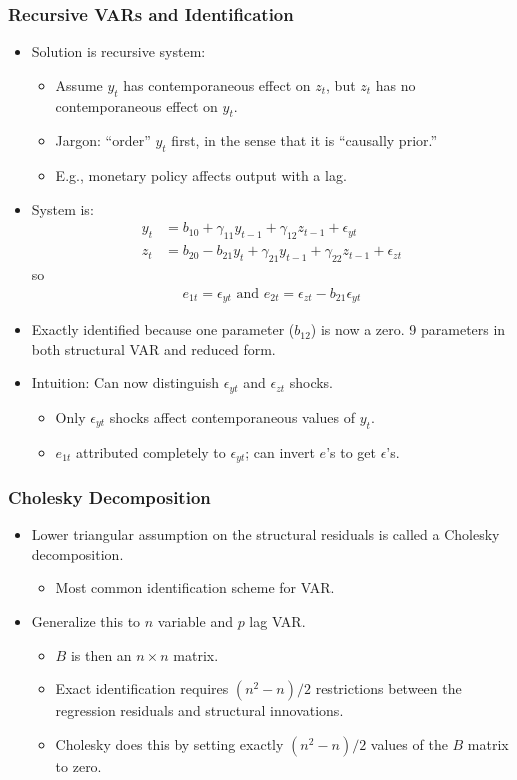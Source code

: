 \documentclass[english,xcolor=svgnames]{beamer}
\begin{document}
\begin{frame}
\frametitle{Recursive VARs and Identification
}
\begin{itemize}
	\item Solution is recursive system:
	\begin{itemize}
		\item Assume $y_t$ has contemporaneous effect on $z_t$, but $z_t$ has no
contemporaneous effect on $y_t$.
		\item Jargon: ``order'' $y_t$ first, in the sense that it is ``causally prior.''
		\item E.g., monetary policy affects output with a lag.
	\end{itemize}
	\item System is:
	\begin{align*}
		y_t &= b_{10} + \gamma_{11}y_{t-1}+\gamma_{12}z_{t-1}+\epsilon_{yt} \\
		z_t &= b_{20}-b_{21}y_t + \gamma_{21}y_{t-1}+\gamma_{22}z_{t-1}+\epsilon_{zt}
	\end{align*}
	so
	\begin{align*}
		e_{1t}=\epsilon_{yt}\text{ and }e_{2t}=\epsilon_{zt}-b_{21}\epsilon_{yt}
	\end{align*}
	\item Exactly identified because one parameter ($b_{12}$) is now a zero. 9 parameters in both structural VAR and reduced form.
	\item Intuition: Can now distinguish $\epsilon_{yt}$ and $\epsilon_{zt}$ shocks.
	\begin{itemize}
		\item Only $\epsilon_{yt}$ shocks affect contemporaneous values of $y_t$.
		\item $e_{1t}$ attributed completely to $\epsilon_{yt}$; can invert $e$'s to get $\epsilon$'s.
	\end{itemize}
\end{itemize}
\end{frame}


\begin{frame}
\frametitle{Cholesky Decomposition
}
\begin{itemize}
	\item Lower triangular assumption on the structural residuals is called a Cholesky decomposition.
	\begin{itemize}
		\item Most common identification scheme for VAR.
	\end{itemize}
	\item Generalize this to $n$ variable and $p$ lag VAR.
	\begin{itemize}
		\item $B$ is then an $n\times n$ matrix.
		\item Exact identification requires $(n^2-n)/2$ restrictions between
the regression residuals and structural innovations.
		\item Cholesky does this by setting exactly $(n^2-n)/2$ values of the
$B$ matrix to zero.
	\end{itemize}
\end{itemize}
\end{frame}
\end{document}
